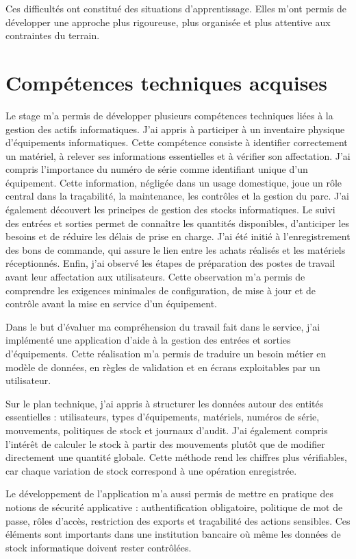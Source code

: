 \documentclass[12pt,a4paper]{report}
\begin{document}
Ces difficultés ont constitué des situations d'apprentissage. Elles m'ont permis de développer une approche plus rigoureuse, plus organisée et plus attentive aux contraintes du terrain.

\section{Compétences techniques acquises}

Le stage m'a permis de développer plusieurs compétences techniques liées à la gestion des actifs informatiques.
J'ai appris à participer à un inventaire physique d'équipements informatiques. Cette compétence consiste à identifier correctement un matériel, à relever ses informations essentielles et à vérifier son affectation.
J'ai compris l'importance du numéro de série comme identifiant unique d'un équipement. Cette information, négligée dans un usage domestique, joue un rôle central dans la traçabilité, la maintenance, les contrôles et la gestion du parc.
J'ai également découvert les principes de gestion des stocks informatiques. Le suivi des entrées et sorties permet de connaître les quantités disponibles, d'anticiper les besoins et de réduire les délais de prise en charge.
J'ai été initié à l'enregistrement des bons de commande, qui assure le lien entre les achats réalisés et les matériels réceptionnés.
Enfin, j'ai observé les étapes de préparation des postes de travail avant leur affectation aux utilisateurs. Cette observation m'a permis de comprendre les exigences minimales de configuration, de mise à jour et de contrôle avant la mise en service d'un équipement.

Dans le but d'évaluer ma compréhension du travail fait dans le service, j'ai implémenté une application d'aide à la gestion des entrées et sorties d'équipements. Cette réalisation m'a permis de traduire un besoin métier en modèle de données, en règles de validation et en écrans exploitables par un utilisateur.

Sur le plan technique, j'ai appris à structurer les données autour des entités essentielles : utilisateurs, types d'équipements, matériels, numéros de série, mouvements, politiques de stock et journaux d'audit. J'ai également compris l'intérêt de calculer le stock à partir des mouvements plutôt que de modifier directement une quantité globale. Cette méthode rend les chiffres plus vérifiables, car chaque variation de stock correspond à une opération enregistrée.

Le développement de l'application m'a aussi permis de mettre en pratique des notions de sécurité applicative : authentification obligatoire, politique de mot de passe, rôles d'accès, restriction des exports et traçabilité des actions sensibles. Ces éléments sont importants dans une institution bancaire où même les données de stock informatique doivent rester contrôlées.
\end{document}
